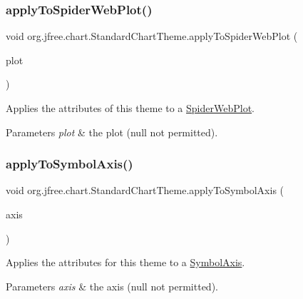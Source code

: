 \subsubsection{\texorpdfstring{apply\+To\+Spider\+Web\+Plot()}{applyToSpiderWebPlot()}}
{\footnotesize\ttfamily void org.\+jfree.\+chart.\+Standard\+Chart\+Theme.\+apply\+To\+Spider\+Web\+Plot (\begin{DoxyParamCaption}\item[{\mbox{\hyperlink{classorg_1_1jfree_1_1chart_1_1plot_1_1_spider_web_plot}{Spider\+Web\+Plot}}}]{plot }\end{DoxyParamCaption})\hspace{0.3cm}{\ttfamily [protected]}}

Applies the attributes of this theme to a \mbox{\hyperlink{}{Spider\+Web\+Plot}}.


\begin{DoxyParams}{Parameters}
{\em plot} & the plot ({\ttfamily null} not permitted). \\
\hline
\end{DoxyParams}
\mbox{\label{classorg_1_1jfree_1_1chart_1_1_standard_chart_theme_a06eaca40142ac15fde415291e7565771}} 
\subsubsection{\texorpdfstring{apply\+To\+Symbol\+Axis()}{applyToSymbolAxis()}}
{\footnotesize\ttfamily void org.\+jfree.\+chart.\+Standard\+Chart\+Theme.\+apply\+To\+Symbol\+Axis (\begin{DoxyParamCaption}\item[{\mbox{\hyperlink{classorg_1_1jfree_1_1chart_1_1axis_1_1_symbol_axis}{Symbol\+Axis}}}]{axis }\end{DoxyParamCaption})\hspace{0.3cm}{\ttfamily [protected]}}

Applies the attributes for this theme to a \mbox{\hyperlink{}{Symbol\+Axis}}.


\begin{DoxyParams}{Parameters}
{\em axis} & the axis ({\ttfamily null} not permitted). \\
\hline
\end{DoxyParams}
\mbox{\label{classorg_1_1jfree_1_1chart_1_1_standard_chart_theme_a4fbb7941f2e566248f5d0f0184781ac5}} 
